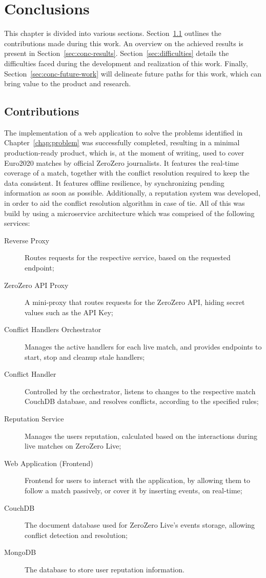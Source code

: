 \chapter{Conclusions} \label{chap:concl}


This chapter is divided into various sections. Section~\ref{sec:conc-contributions} outlines the contributions made during this work. An overview on the achieved results is present in Section~\ref{sec:conc-results}. Section~\ref{sec:difficulties} details the difficulties faced during the development and realization of this work. Finally, Section~\ref{sec:conc-future-work} will delineate future paths for this work, which can bring value to the product and research.

\section{Contributions} \label{sec:conc-contributions}

The implementation of a web application to solve the problems identified in Chapter~\ref{chap:problem} was successfully completed, resulting in a minimal production-ready product, which is, at the moment of writing, used to cover Euro2020 matches by official ZeroZero journalists. It features the real-time coverage of a match, together with the conflict resolution required to keep the data consistent. It features offline resilience, by synchronizing pending information as soon as possible. Additionally, a reputation system was developed, in order to aid the conflict resolution algorithm in case of tie. All of this was build by using a microservice architecture which was comprised of the following services:
\begin{description}
    \item[Reverse Proxy] Routes requests for the respective service, based on the requested endpoint;
    \item[ZeroZero API Proxy] A mini-proxy that routes requests for the ZeroZero API, hiding secret values such as the API Key;
    \item[Conflict Handlers Orchestrator] Manages the active handlers for each live match, and provides endpoints to start, stop and cleanup stale handlers;
    \item[Conflict Handler] Controlled by the orchestrator, listens to changes to the respective match CouchDB database, and resolves conflicts, according to the specified rules;
    \item[Reputation Service] Manages the users reputation, calculated based on the interactions during live matches on ZeroZero Live;
    \item[Web Application (Frontend)] Frontend for users to interact with the application, by allowing them to follow a match passively, or cover it by inserting events, on real-time;
    \item[CouchDB] The document database used for ZeroZero Live's events storage, allowing conflict detection and resolution;
    \item[MongoDB] The database to store user reputation information.
\end{description}

